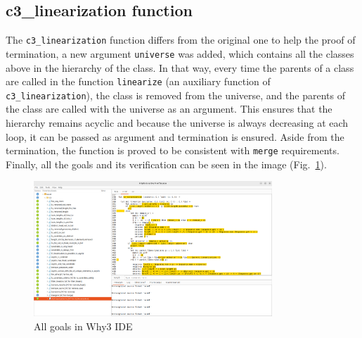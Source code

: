 \documentclass[runningheads]{llncs}
\begin{document}
\subsection{c3\_linearization function}
The \texttt{c3\_linearization} function differs from the original one to help the proof of termination, a new argument \texttt{universe} was added, which contains all the classes above in the hierarchy of the class.
In that way, every time the parents of a class are called in the function \texttt{linearize} (an auxiliary function of \texttt{c3\_linearization}), the class is removed from the universe, and the parents of the class are called with the universe as an argument.
This ensures that the hierarchy remains acyclic and because the universe is always decreasing at each loop, it can be passed as argument and termination is ensured.
Aside from the termination, the function is proved to be consistent with \texttt{merge} requirements.\\
Finally, all the goals and its verification can be seen in the image (Fig.~\ref{fig:Why3C3}).
\begin{figure}[htbp]
  \centering
  \includegraphics[width=0.8\textwidth]{images/Why3C3.png}
  \caption{All goals in Why3 IDE}
  \label{fig:Why3C3}
\end{figure}
\end{document}
